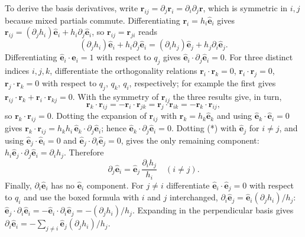 To derive the basis derivatives, write
$\mathbf r_{ij}=\partial_j\mathbf r_i=\partial_i\partial_j\mathbf r$,
which is symmetric in $i,j$ because mixed partials commute.
Differentiating $\mathbf r_i=h_i\hat{\mathbf e}_i$ gives
$\mathbf r_{ij}=(\partial_jh_i)\hat{\mathbf e}_i+h_i\partial_j\hat{\mathbf e}_i$,
so $\mathbf r_{ij}=\mathbf r_{ji}$ reads
\[
(\partial_jh_i)\hat{\mathbf e}_i+h_i\partial_j\hat{\mathbf e}_i
=(\partial_ih_j)\hat{\mathbf e}_j+h_j\partial_i\hat{\mathbf e}_j.
\tag{*}
\]
Differentiating $\hat{\mathbf e}_i\cdot\hat{\mathbf e}_i=1$ with
respect to $q_j$ gives $\hat{\mathbf e}_i\cdot\partial_j\hat{\mathbf e}_i=0$.
For three distinct indices $i,j,k$, differentiate the orthogonality
relations $\mathbf r_i\cdot\mathbf r_k=0$, $\mathbf r_i\cdot\mathbf r_j=0$,
$\mathbf r_j\cdot\mathbf r_k=0$ with respect to $q_j$, $q_k$, $q_i$,
respectively; for example the first gives
$\mathbf r_{ij}\cdot\mathbf r_k+\mathbf r_i\cdot\mathbf r_{kj}=0$.
With the symmetry of $\mathbf r_{ij}$ the three results give, in turn,
\[
\mathbf r_k\cdot\mathbf r_{ij}
=-\mathbf r_i\cdot\mathbf r_{jk}
=\mathbf r_j\cdot\mathbf r_{ik}
=-\mathbf r_k\cdot\mathbf r_{ij},
\]
so $\mathbf r_k\cdot\mathbf r_{ij}=0$. Dotting the expansion of
$\mathbf r_{ij}$ with $\mathbf r_k=h_k\hat{\mathbf e}_k$ and using
$\hat{\mathbf e}_k\cdot\hat{\mathbf e}_i=0$ gives
$\mathbf r_k\cdot\mathbf r_{ij}=h_kh_i\,\hat{\mathbf e}_k\cdot\partial_j\hat{\mathbf e}_i$;
hence $\hat{\mathbf e}_k\cdot\partial_j\hat{\mathbf e}_i=0$.
Dotting (*) with $\hat{\mathbf e}_j$ for $i\ne j$, and using
$\hat{\mathbf e}_j\cdot\hat{\mathbf e}_i=0$ and
$\hat{\mathbf e}_j\cdot\partial_i\hat{\mathbf e}_j=0$, gives the only
remaining component:
$h_i\hat{\mathbf e}_j\cdot\partial_j\hat{\mathbf e}_i=\partial_i h_j$.
Therefore
\[
\boxed{\partial_j\hat{\mathbf e}_i
=\hat{\mathbf e}_j\,\frac{\partial_i h_j}{h_i}\quad(i\ne j)}.
\]
Finally, $\partial_i\hat{\mathbf e}_i$ has no $\hat{\mathbf e}_i$
component. For $j\ne i$ differentiate $\hat{\mathbf e}_i\cdot\hat{\mathbf e}_j=0$
with respect to $q_i$ and use the boxed formula with $i$ and $j$
interchanged, $\partial_i\hat{\mathbf e}_j=\hat{\mathbf e}_i(\partial_jh_i)/h_j$:
$\hat{\mathbf e}_j\cdot\partial_i\hat{\mathbf e}_i
=-\hat{\mathbf e}_i\cdot\partial_i\hat{\mathbf e}_j
=-(\partial_jh_i)/h_j$.
Expanding in the perpendicular basis gives
$\boxed{\partial_i\hat{\mathbf e}_i
=-\sum_{j\ne i}\hat{\mathbf e}_j(\partial_jh_i)/h_j}$.

